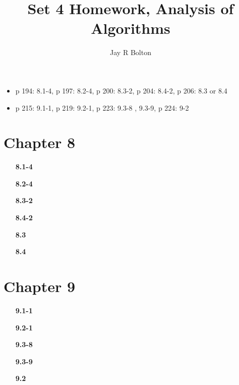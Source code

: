 \documentclass{article}
\title{Set 4 Homework, Analysis of Algorithms}
\author{Jay R Bolton}
\begin{document}
\maketitle

\begin{itemize}
\item p 194: 8.1-4, p 197: 8.2-4, p 200: 8.3-2, p 204: 8.4-2, p 206: 8.3 or 8.4
\item p 215: 9.1-1, p 219: 9.2-1, p 223: 9.3-8 , 9.3-9, p 224: 9-2 
\end{itemize}

\section*{Chapter 8}

\begin{enumerate}

\item[\textbf{8.1-4}]

\item[\textbf{8.2-4}]

\item[\textbf{8.3-2}]

\item[\textbf{8.4-2}]

\item[\textbf{8.3}]

\item[\textbf{8.4}]

\end{enumerate}

\section*{Chapter 9}

\begin{enumerate}

\item[\textbf{9.1-1}]

\item[\textbf{9.2-1}]

\item[\textbf{9.3-8}]

\item[\textbf{9.3-9}]

\item[\textbf{9.2}]

\end{enumerate}
\end{document}
